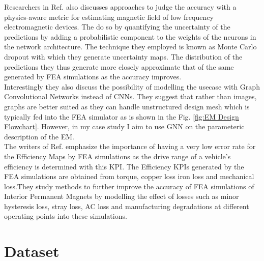 \documentclass{report} %
\begin{document}
Researchers in Ref. \cite{DL-MF-2019} also discusses approaches to judge the accuracy with a physics-aware metric for estimating 
magnetic field of low frequency electromagnetic devices. The do so by quantifying the uncertainty of the predictions by adding a probabilistic component to the weights 
of the neurons in the network architecture. The technique they employed is known as  Monte Carlo dropout with which they generate uncertainty maps. 
The distribution of the predictions they thus generate more closely approximate that of the same generated by \ac{FEA} simulations as the accuracy improves.\\
Interestingly they also discuss the possibility of modelling the usecase with Graph Convolutional Networks instead of \ac{CNN}s.
They suggest that rather than images, graphs are better suited as they can handle unstructured design mesh which is typically fed into the \ac{FEA} simulator 
as is shown in the Fig. \ref{fig:EM Design Flowchart}. However, in my case study I aim to use \ac{GNN} on the parameteric description of the \ac{EM}. \\

The writers of Ref. \cite{ETA-LA-2020} emphasize the importance of having a very low error rate for the Efficiency Maps by \ac{FEA} simulations as the drive range of a 
vehicle's efficiency is determined with this \ac{KPI}. The Efficiency \ac{KPI}s generated by the \ac{FEA} simulations are obtained from torque, copper loss iron loss 
and mechanical loss.They study methods to further improve the accuracy of \ac{FEA} simulations of Interior Permanent Magnets by modelling the effect 
of losses such as minor hysteresis loss, stray loss, AC loss and manufacturing degradations at different operating points into these simulations.\\

\chapter{Dataset} 
\end{document}
